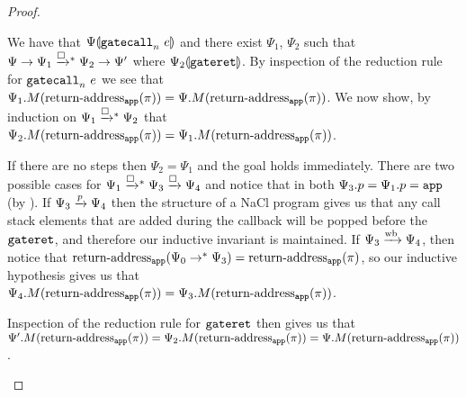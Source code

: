 \begin{proof}
\begin{itemize}
    We have that ${\Psi}\llparenthesis{\ensuremath{\mathtt{gatecall}_{n}\ {e}}}\rrparenthesis$ and there exist $\Psi_1$, $\Psi_2$  such that $\Psi \step \Psi_1 \stepboxstar \Psi_2 \step \Psi'$ where ${\Psi_2}\llparenthesis{\ensuremath{\mathtt{gateret}}}\rrparenthesis$.
    By inspection of the reduction rule for $\mathtt{gatecall}_{n}\ {e}$ we see that $\Psi_1.M(\operatorname{return-address}_{\mathtt{app}}(\pi)) = \Psi.M(\operatorname{return-address}_{\mathtt{app}}(\pi))$.
    We now show, by induction on $\Psi_1 \stepboxstar \Psi_2$ that $\Psi_2.M(\operatorname{return-address}_{\mathtt{app}}(\pi)) = \Psi_1.M(\operatorname{return-address}_{\mathtt{app}}(\pi))$.

    \begin{subproof}
      \sloppy
      If there are no steps then $\Psi_2 = \Psi_1$ and the goal holds immediately.
      There are two possible cases for $\Psi_1 \stepboxstar \Psi_3 \stepbox \Psi_4$ and notice that in both $\Psi_3.p = \Psi_1.p = \mathtt{app}$ (by ).
      If $\Psi_3 \mathrel{\xrightarrow{p}} \Psi_4$ then the structure of a NaCl program gives us that any call stack elements that are added during the callback will be popped before the $\mathtt{gateret}$, and therefore our inductive invariant is maintained.
      If $\Psi_3 \mathrel{\xrightarrow{\!\text{wb}}} \Psi_4$, then notice that $\operatorname{return-address}_{\mathtt{app}}(\Psi_0 \mathrel{\mathrel{\rightarrow}^{\ast}} \Psi_3) = \operatorname{return-address}_{\mathtt{app}}(\pi)$, so our inductive hypothesis gives us that $\Psi_4.M(\operatorname{return-address}_{\mathtt{app}}(\pi)) = \Psi_3.M(\operatorname{return-address}_{\mathtt{app}}(\pi))$.
    \end{subproof}

    Inspection of the reduction rule for $\mathtt{gateret}$ then gives us that $\Psi'.M(\operatorname{return-address}_{\mathtt{app}}(\pi)) = \Psi_2.M(\operatorname{return-address}_{\mathtt{app}}(\pi)) = \Psi.M(\operatorname{return-address}_{\mathtt{app}}(\pi))$.
  \end{itemize}
\end{proof}

